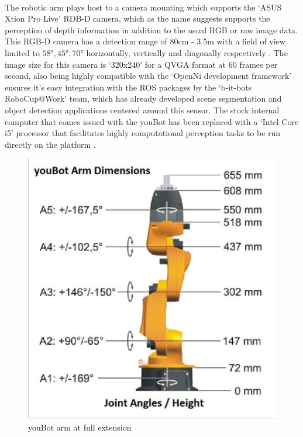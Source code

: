 \paragraph{}The robotic arm plays host to a camera mounting which supports the `ASUS Xtion Pro Live' RDB-D camera, which as the name suggests supports the perception of depth information in addition to the usual RGB or raw image data. This RGB-D camera has a detection range of 80cm - 3.5m with a field of view limited to $\ang{58}, \ang{45}, \ang{70}$ horizontally, vertically and diagonally respectively \cite{swoboda2014comprehensive}. The image size for this camera is `320x240' for a QVGA format at 60 frames per second, also being highly compatible with the `OpenNi development framework' ensures it's easy integration with the ROS packages by the `b-it-bots RoboCup@Work' team, which has already developed scene segmentation and object detection applications centered around this sensor. The stock internal computer that comes issued with the youBot has been replaced with a `Intel Core i5' processor that facilitates highly computational perception tasks to be run directly on the platform \cite{Roscoe2012}. 

\begin{figure}[h]
	\centering
	\includegraphics[scale=0.5]{images/youbot_arm}
	\caption{youBot arm at full extension}
	\label{fig:youbotarm}
\end{figure}

